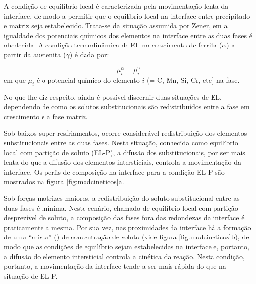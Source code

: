 
A condição de equilíbrio local é caracterizada pela movimentação lenta da interface, de modo a permitir que o equilíbrio local na interface entre precipitado e matriz seja estabelecido. Trata-se da situação assumida por Zener, em a igualdade dos potenciais químicos dos elementos na interface entre as duas fases é obedecida. A condição termodinâmica de EL no crescimento de ferrita ($\alpha$) a partir da austenita ($\gamma$) é dada por:

\begin{equation}
	\mu_i^\alpha = \mu_i^\gamma
\end{equation}
%
em que $\mu_i$ é o potencial químico do elemento $i$ (= C, Mn, Si, Cr, etc) na fase.

No que lhe diz respeito, ainda é possível discernir duas situações de EL, dependendo de como os solutos substitucionais são redistribuídos entre a fase em crescimento e a fase matriz.

Sob baixos super-resfriamentos, ocorre considerável redistribuição dos elementos substitucionais entre as duas fases. Nesta situação, conhecida como equilíbrio local com partição de soluto (EL-P), a difusão dos substitucionais, por ser mais lenta do que a difusão dos elementos intersticiais, controla a movimentação da interface. Os perfis de composição na interface para a condição EL-P são mostrados na figura \ref{fig:modcineticos}a.

Sob forças motrizes maiores, a redistribuição do soluto substitucional entre as duas fases é mínima. Neste cenário, chamado de equilíbrio local com partição desprezível de soluto, a composição das fases fora das redondezas da interface é praticamente a mesma. Por sua vez, nas proximidades da interface há a formação de uma ``crista'' () de concentração de soluto (vide figura \ref{fig:modcineticos}b), de modo que as condições de equilíbrio sejam estabelecidas na interface e, portanto, a difusão do elemento intersticial controla a cinética da reação. Nesta condição, portanto, a movimentação da interface tende a ser mais rápida do que na situação de EL-P. %


